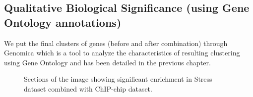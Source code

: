\subsection{Qualitative Biological Significance (using Gene Ontology annotations)} \label{maxent_biosig_go}

We put the final clusters of genes (before and after combination) through Genomica which is a tool to analyze the characteristics of resulting clustering using Gene Ontology and has been detailed in the 
previous chapter.
 
\begin{figure}[p]
\centering
{}
\label{fig:maxent_stress_chip_enrich}
\caption{Sections of the image showing significant enrichment in Stress dataset combined with ChIP-chip dataset.}
\end{figure}

